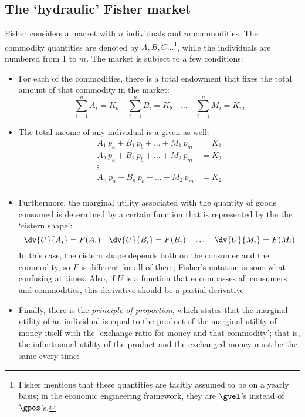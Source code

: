 \subsection*{The `hydraulic' Fisher market}
Fisher considers a market with $n$ individuals and $m$ commodities. The commodity quantities are denoted by $A, B, C \ldots$\footnote{Fisher mentions that these quantities are tacitly assumed to be on a yearly basis; in the economic engineering framework, they are $\gvel$'s instead of $\gpos$'s.}, while the individuals are numbered from 1 to $m$. The market is subject to a few conditions:
\begin{itemize}
    \item For each of the commodities, there is a total endowment that fixes the total amount of that commodity in the market:
    \begin{equation*}
            \sum_{i = 1}^{n} A_i = K_a
            \quad \sum_{i = 1}^{n} B_i = K_b
            \quad \ldots \quad \sum_{i = 1}^{n} M_i = K_m
    \end{equation*}
    \item The total income of any individual is a given as well:
    \begin{equation*}
        \begin{split}
            A_1\,p_a + B_1\,p_b + \ldots + M_1\,p_m &= K_1 \\
            A_2\,p_a + B_2\,p_b + \ldots + M_2\,p_m &= K_2 \\
            \vdots&\\
            A_n\,p_a + B_n\,p_b + \ldots + M_2\,p_m &= K_2 \\
        \end{split}
    \end{equation*}
    \item Furthermore, the marginal utility associated with the quantity of goods consumed is determined by a certain function that is represented by the the `cistern shape':
    \begin{equation*}
        \dv{U}{A_i} = F(A_i) \quad \dv{U}{B_i} = F(B_i) \quad 
        \ldots \quad
        \dv{U}{M_i} = F(M_i)
    \end{equation*}
    In this case, the cistern shape depends both on the consumer and the commodity, so $F$ is different for all of them; Fisher's notation is somewhat confusing at times. Also, if $U$ is a function that encompasses all consumers and commodities, this derivative should be a partial derivative. 
    \item Finally, there is the \emph{principle of proportion}, which states that the marginal utility of an individual is equal to the product of the marginal utility of money itself with the 'exchange ratio for money and that commodity'; that is, the infinitesimal utility of the product and the exchanged money must be the same every time:

\end{itemize}
